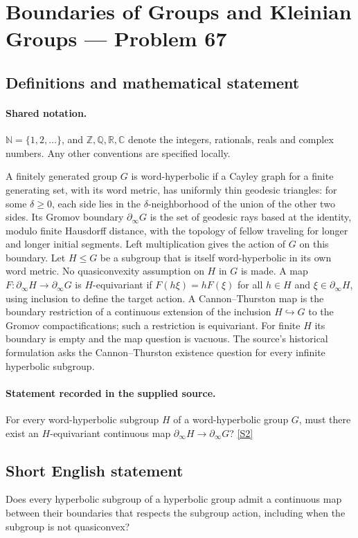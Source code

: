 \documentclass[11pt]{article}
\newcommand{\sref}[2]{\hyperlink{source:#1:#2}{[S#2]}}
\begin{document}
\section{Boundaries of Groups and Kleinian Groups — Problem 67}\label{statement}

\subsection{Definitions and mathematical statement}

\paragraph{Shared notation.}$\mathbb N=\{1,2,\ldots\}$, and $\mathbb Z,\mathbb Q,\mathbb R,\mathbb C$ denote the integers, rationals, reals and complex numbers. Any other conventions are specified locally.


A finitely generated group $G$ is word-hyperbolic if a Cayley graph for a finite generating set, with its word metric, has uniformly thin geodesic triangles: for some $\delta\geq0$, each side lies in the $\delta$-neighborhood of the union of the other two sides. Its Gromov boundary $\partial_\infty G$ is the set of geodesic rays based at the identity, modulo finite Hausdorff distance, with the topology of fellow traveling for longer and longer initial segments. Left multiplication gives the action of $G$ on this boundary.
Let $H\leq G$ be a subgroup that is itself word-hyperbolic in its own word metric. No quasiconvexity assumption on $H$ in $G$ is made. A map $F:\partial_\infty H\to\partial_\infty G$ is $H$-equivariant if $F(h\xi)=hF(\xi)$ for all $h\in H$ and $\xi\in\partial_\infty H$, using inclusion to define the target action. A Cannon--Thurston map is the boundary restriction of a continuous extension of the inclusion $H\hookrightarrow G$ to the Gromov compactifications; such a restriction is equivariant. For finite $H$ its boundary is empty and the map question is vacuous. The source's historical formulation asks the Cannon--Thurston existence question for every infinite hyperbolic subgroup.
\paragraph{Statement recorded in the supplied source.}
For every word-hyperbolic subgroup $H$ of a word-hyperbolic group $G$, must there exist an $H$-equivariant continuous map $\partial_\infty H\to\partial_\infty G$? \sref{statement}{2}
\subsection{Short English statement}
Does every hyperbolic subgroup of a hyperbolic group admit a continuous map between their boundaries that respects the subgroup action, including when the subgroup is not quasiconvex?
\end{document}
